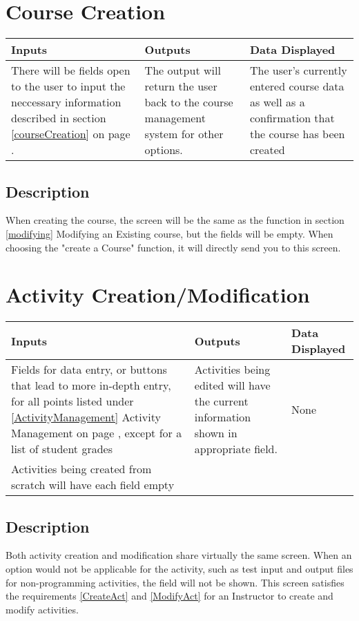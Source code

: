 \documentclass{article}
\begin{document}
\section{Course Creation}
\begin{tabular}{| p{5cm} | p{5cm} | p{5cm} |}
	\hline
	Inputs & Outputs & Data Displayed \\ \hline
	There will be fields open to the user to input the neccessary information described
in section \ref{courseCreation} on page \pageref{courseCreation}.
	& The output will return
the user back to the course management system for other options.
	& The user's currently entered course data as well as a confirmation that the course
	has been created
	\\ \hline
\end{tabular}

\subsection{Description}
When creating the course, the screen will be the same as the function in section
\ref{modifying} Modifying an Existing course, but the fields will be empty.
When choosing the "create a Course" function, it will directly send you to this screen.

\section{Activity Creation/Modification}
\begin{tabular}{| p{5cm} | p{5cm} | p{5cm} |}
	\hline
	Inputs & Outputs & Data Displayed \\ \hline
	Fields for data entry, or buttons that lead to more in-depth entry, for all points listed under \ref{ActivityManagement} Activity Management on page \pageref{ActivityManagement}, except for a list of student grades
	& Activities being edited will have the current information shown in appropriate field. & None
	\\Activities being created from scratch will have each field empty & &
	\\ \hline
\end{tabular}

\subsection{Description}
Both activity creation and modification share virtually the same screen.
When an option would not be applicable for the activity, such as test input and
output files for non-programming activities, the field will not be shown.
This screen satisfies the requirements \ref{CreateAct} and \ref{ModifyAct} for
an Instructor to create and modify activities.
\end{document}
